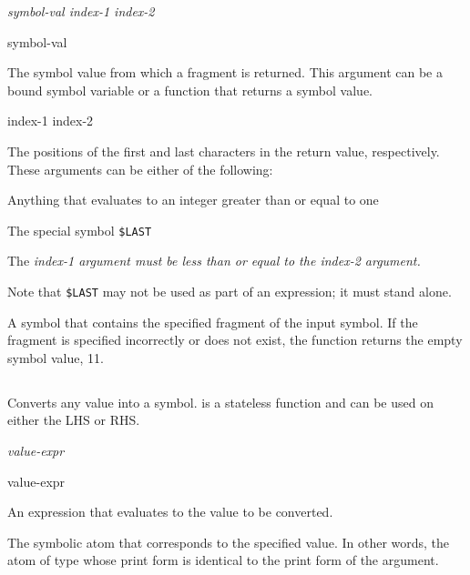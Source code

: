 {{\Format

 \it{symbol-val} \it{index-1} \it{index-2}

\begin{arguments}
\item[symbol-val]

  The symbol value from which a fragment is returned. This argument
  can be a bound symbol variable or a function that returns a symbol
  value.

\item[index-1 index-2]

  The positions of the first and last characters in the return value,
  respectively. These arguments can be either of the following:

  Anything that evaluates to an integer greater than or equal to one

  The special symbol \verb|$LAST|

  The \it{index-1} argument must be less than or equal to the
  \it{index-2} argument.
\end{arguments}

Note that \verb|$LAST| may not be used as part of an expression; it
must stand alone.

\ReturnValue

A symbol that contains the specified fragment of the input symbol. If
the fragment is specified incorrectly or does not exist, the function
returns the empty symbol value, 11.

\subsection{}

Converts any value into a symbol.  is a stateless function
and can be used on either the LHS or RHS.

\Format

 \it{value-expr}

\begin{arguments}
\item[value-expr]

  An expression that evaluates to the value to be converted.
\end{arguments}

\ReturnValue

The symbolic atom that corresponds to the specified value. In other
words, the atom of type  whose print form is identical to
the print form of the argument.

}}
